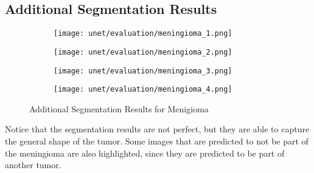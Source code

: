 \subsection{Additional Segmentation Results}

\begin{figure}[H]
  \centering
  \begin{subfigure}[b]{0.23\textwidth}
    \centering
    \texttt{[image: unet/evaluation/meningioma\_1.png]}
  \end{subfigure}
  \hfill
  \begin{subfigure}[b]{0.23\textwidth}
    \centering
    \texttt{[image: unet/evaluation/meningioma\_2.png]}
  \end{subfigure}
  \hfill
  \begin{subfigure}[b]{0.23\textwidth}
    \centering
    \texttt{[image: unet/evaluation/meningioma\_3.png]}
  \end{subfigure}
  \hfill
  \begin{subfigure}[b]{0.23\textwidth}
    \centering
    \texttt{[image: unet/evaluation/meningioma\_4.png]}
  \end{subfigure}
  \caption{Additional Segmentation Results for Menigioma}
  \label{fig:additional_malignoma_segmentation}
\end{figure}

Notice that the segmentation results are not perfect, but they are able to capture the general shape of the tumor. Some images that are predicted to not be part of the meningioma are also highlighted, since they are predicted to be part of another tumor.

%

